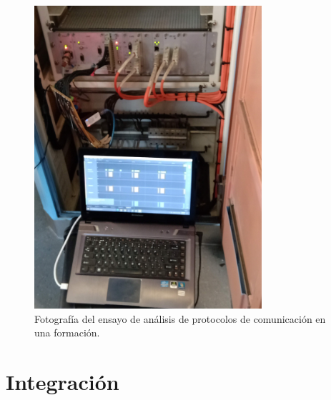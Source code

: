 \documentclass[
11pt, %
]{charter}
\begin{document}
\begin{figure}[htpb]
\centering 
\includegraphics[width=0.75\textwidth]{./Pics/IMG_20210414_104653.jpg}
\caption{Fotografía del ensayo de análisis de protocolos de comunicación en una formación.}
\label{fig:sniffingPhoto}
\end{figure}

\section{Integración}
\end{document}
